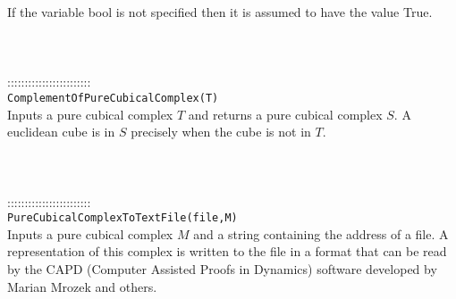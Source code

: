 \documentclass[a4paper,11pt]{report}
\begin{document}
{ If the variable bool is not specified then it is assumed to have the value
True. \\
 \\
 \\
 \\
 ::::::::::::::::::::::::\\
 \texttt{ComplementOfPureCubicalComplex(T)}\\
 

 Inputs a pure cubical complex $T$ and returns a pure cubical complex $S$. A euclidean cube is in $S$ precisely when the cube is not in $T$. \\
 \\
 \\
 \\
 ::::::::::::::::::::::::\\
 \texttt{PureCubicalComplexToTextFile(file,M)}\\
 

 Inputs a pure cubical complex $M$ and a string containing the address of a file. A representation of this
complex is written to the file in a format that can be read by the CAPD
(Computer Assisted Proofs in Dynamics) software developed by Marian Mrozek and
others. \\
 \\
 \\
 }

 
\end{document}
